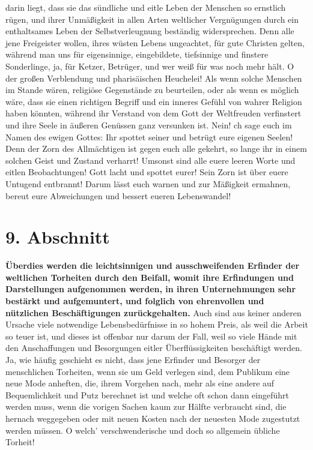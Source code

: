 {darin liegt, dass sie das sündliche und eitle Leben der Menschen so ernstlich
rügen, und ihrer Unmäßigkeit in allen Arten weltlicher Vergnügungen durch ein
enthaltsames Leben der Selbstverleugnung beständig widersprechen. Denn alle jene
Freigeister wollen, ihres wüsten Lebens
ungeachtet, für gute Christen gelten,
während man uns für eigensinnige, eingebildete, tiefsinnige und finstere
Sonderlinge, ja, für Ketzer, Betrüger, und wer weiß für
was noch mehr hält. O der großen Verblendung und pharisäischen
Heuchelei!
Als wenn solche Menschen im
Stande wären, religiöse Gegenstände zu beurteilen, oder als wenn es möglich
wäre, dass sie einen richtigen Begriff und ein inneres Gefühl von wahrer
Religion
haben könnten, während ihr Verstand von dem Gott der Weltfreuden verfinstert
und ihre Seele in äußeren Genüssen ganz versunken ist. Nein! ch sage euch im
Namen des ewigen Gottes: Ihr spottet seiner und betrügt eure eigenen Seelen!
Denn der Zorn des Allmächtigen ist gegen euch alle gekehrt, so lange ihr in
einem solchen Geist und Zustand verharrt! Umsonst sind alle euere leeren Worte
und eitlen Beobachtungen! Gott lacht und spottet eurer! Sein Zorn ist über euere
Untugend entbrannt! Darum lässt euch warnen und zur Mäßigkeit ermahnen, bereut
eure Abweichungen und bessert eueren Lebenswandel!

\section{9. Abschnitt} \label{kap17_ab9}

\label{ref:17_09_bedarf_wecken}
\textbf{Überdies werden die leichtsinnigen und
ausschweifenden Erfinder der weltlichen
Torheiten durch den Beifall, womit ihre Erfindungen und Darstellungen
aufgenommen werden, in ihren Unternehmungen sehr bestärkt und aufgemuntert, und
folglich von ehrenvollen und nützlichen Beschäftigungen zurückgehalten.} Auch
sind aus keiner anderen Ursache viele notwendige Lebensbedürfnisse in so hohem
Preis, als weil die Arbeit so teuer ist, und dieses ist offenbar nur darum der
Fall, weil so viele Hände mit den Anschaffungen und Besorgungen eitler
Überflüssigkeiten beschäftigt werden. Ja, wie häufig geschieht es nicht, dass
jene Erfinder und Besorger der menschlichen Torheiten, wenn sie um Geld
verlegen sind, dem Publikum eine neue Mode anheften, die, ihrem Vorgehen nach,
mehr als eine andere auf Bequemlichkeit und Putz berechnet ist und welche oft
schon dann eingeführt werden muss, wenn die vorigen Sachen kaum zur Hälfte
verbraucht sind, die hernach weggegeben oder mit neuen Kosten nach der neuesten
Mode zugestutzt werden müssen. O welch' verschwenderische und doch so allgemein
übliche Torheit!

}
